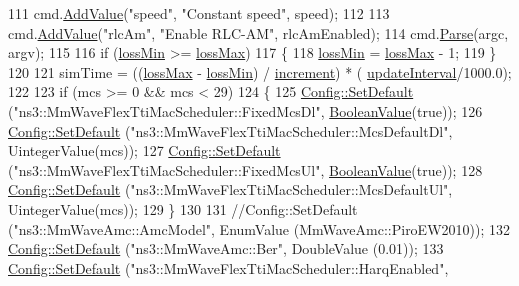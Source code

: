 \begin{DoxyCode}
111         cmd.\hyperlink{classns3_1_1CommandLine_addcfb546c7ad4c8bd0965654d55beb8e}{AddValue}(\textcolor{stringliteral}{"speed"}, \textcolor{stringliteral}{"Constant speed"}, speed);
112 
113         cmd.\hyperlink{classns3_1_1CommandLine_addcfb546c7ad4c8bd0965654d55beb8e}{AddValue}(\textcolor{stringliteral}{"rlcAm"}, \textcolor{stringliteral}{"Enable RLC-AM"}, rlcAmEnabled);
114         cmd.\hyperlink{classns3_1_1CommandLine_a5c10b85b3207e5ecb48d907966923156}{Parse}(argc, argv);
115 
116         \textcolor{keywordflow}{if} (\hyperlink{mmwave-amc-test2_8cc_a9ca00a53092f2e9430cb7f39c9831c11}{lossMin} >= \hyperlink{mmwave-amc-test2_8cc_a3af69feb20a1e00eb0e56f03d201302d}{lossMax})
117         \{
118                 \hyperlink{mmwave-amc-test2_8cc_a9ca00a53092f2e9430cb7f39c9831c11}{lossMin} = \hyperlink{mmwave-amc-test2_8cc_a3af69feb20a1e00eb0e56f03d201302d}{lossMax} - 1;
119         \}
120 
121         simTime = ((\hyperlink{mmwave-amc-test2_8cc_a3af69feb20a1e00eb0e56f03d201302d}{lossMax} - \hyperlink{mmwave-amc-test2_8cc_a9ca00a53092f2e9430cb7f39c9831c11}{lossMin}) / \hyperlink{mmwave-amc-test2_8cc_ac504dff76b24ab9f15536c51aec9fbbb}{increment}) * (
      \hyperlink{mmwave-amc-test2_8cc_adb43d41f676710da0bfbc1ca090e3076}{updateInterval}/1000.0);
122 
123         \textcolor{keywordflow}{if} (mcs >= 0 && mcs < 29)
124         \{
125                 \hyperlink{group__config_ga2e7882df849d8ba4aaad31c934c40c06}{Config::SetDefault} (\textcolor{stringliteral}{"ns3::MmWaveFlexTtiMacScheduler::FixedMcsDl"}, 
      \hyperlink{classns3_1_1BooleanValue}{BooleanValue}(\textcolor{keyword}{true}));
126                 \hyperlink{group__config_ga2e7882df849d8ba4aaad31c934c40c06}{Config::SetDefault} (\textcolor{stringliteral}{"ns3::MmWaveFlexTtiMacScheduler::McsDefaultDl"}, 
      UintegerValue(mcs));
127                 \hyperlink{group__config_ga2e7882df849d8ba4aaad31c934c40c06}{Config::SetDefault} (\textcolor{stringliteral}{"ns3::MmWaveFlexTtiMacScheduler::FixedMcsUl"}, 
      \hyperlink{classns3_1_1BooleanValue}{BooleanValue}(\textcolor{keyword}{true}));
128                 \hyperlink{group__config_ga2e7882df849d8ba4aaad31c934c40c06}{Config::SetDefault} (\textcolor{stringliteral}{"ns3::MmWaveFlexTtiMacScheduler::McsDefaultUl"}, 
      UintegerValue(mcs));
129         \}
130 
131         \textcolor{comment}{//Config::SetDefault ("ns3::MmWaveAmc::AmcModel", EnumValue (MmWaveAmc::PiroEW2010));}
132         \hyperlink{group__config_ga2e7882df849d8ba4aaad31c934c40c06}{Config::SetDefault} (\textcolor{stringliteral}{"ns3::MmWaveAmc::Ber"}, DoubleValue (0.01));
133         \hyperlink{group__config_ga2e7882df849d8ba4aaad31c934c40c06}{Config::SetDefault} (\textcolor{stringliteral}{"ns3::MmWaveFlexTtiMacScheduler::HarqEnabled"}, 

\end{DoxyCode}
